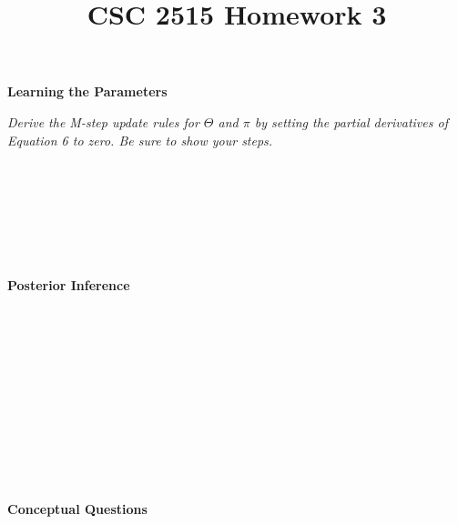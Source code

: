 \documentclass{myhw}
\title{CSC 2515 Homework 3}
\begin{document}
\begin{homeworkProblem}
\textbf{Learning the Parameters} 
\begin{homeworkSection}	
\emph{Derive the M-step update rules for $\Theta$ and $\pi$ by setting the partial derivatives of Equation 6 to zero. Be sure to show your steps.} \\
\\
\end{homeworkSection}
\begin{homeworkSection}	
\emph{} \\
\\
\end{homeworkSection}
\begin{homeworkSection}	
\emph{} \\
\\
\end{homeworkSection}
\end{homeworkProblem}


\begin{homeworkProblem}
\textbf{Posterior Inference}
\begin{homeworkSection}
\emph{} \\
\\
\end{homeworkSection}
\begin{homeworkSection}
\emph{} \\
\\
\end{homeworkSection}
\begin{homeworkSection}	
\emph{} \\
\\
\end{homeworkSection}
\begin{homeworkSection}	
\emph{} \\
\\
\end{homeworkSection}
\end{homeworkProblem}


\begin{homeworkProblem}
\textbf{Conceptual Questions}
\begin{homeworkSection}	
\emph{} \\
\\
\end{homeworkSection}
\begin{homeworkSection}	
\emph{} \\
\\
\end{homeworkSection}
\begin{homeworkSection}	
\emph{} \\
\\
\end{homeworkSection}
\end{homeworkProblem}
\end{document}
